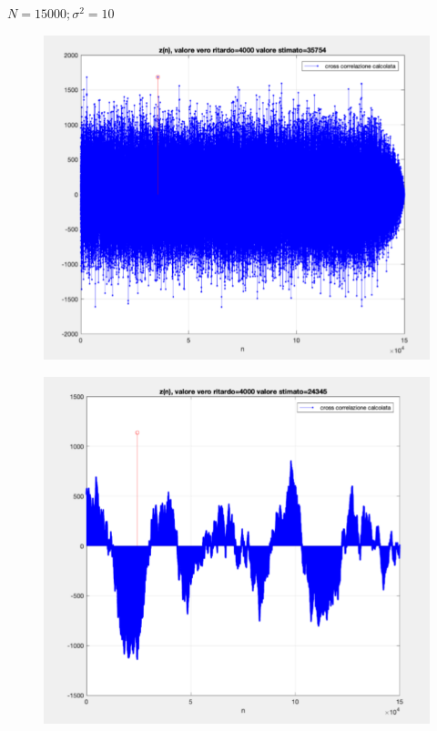 \bigskip

$N = 15000; \sigma^2 = 10$

\begin{minipage}{.45\textwidth}
	
	\begin{figure}[H]
		\centering
		\includegraphics[width=\textwidth]{./images/cap2/es3_grafico3.png}
	\end{figure}	
	
\end{minipage}
\hfill
\begin{minipage}{.45\textwidth}

	\begin{figure}[H]
		\centering
		\includegraphics[width=\textwidth]{./images/cap2/es3_grafico4.png}
	\end{figure}

\end{minipage}
